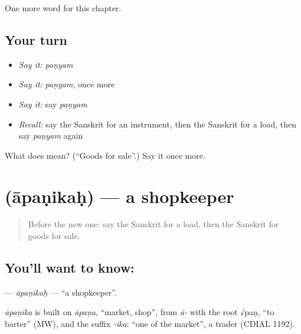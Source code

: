 \begin{grammarlens}[title={What you've built}]
One more word for this chapter.
\end{grammarlens}

\subsection*{Your turn}
\begin{itemize}
\raggedright
  \item \emph{Say it:} \emph{paṇyam}
  \item \emph{Say it:} \emph{paṇyam}, once more
  \item \emph{Say it:} say \emph{paṇyam}
  \item \emph{Recall:} say the Sanskrit for an instrument, then the Sanskrit for a load, then say \emph{paṇyam} again
\end{itemize}

\begin{tcolorbox}[breakable,colback=teal!4,colframe=teal!35!black,title={Before you move on}]
What does  mean? (\textquotedblleft{}Goods for sale\textquotedblright{}.) Say it once more.
\end{tcolorbox}
\section[\texorpdfstring{\sk{आपणिकः} (āpaṇikaḥ)}{आपणिकः (āpaṇikaḥ)}]{ (āpaṇikaḥ) — a shopkeeper}

\label{lesson:SA-C222-apanikah}



\begin{quote}
Before the new one: say the Sanskrit for a load, then the Sanskrit for goods for sale.
\end{quote}

\subsection*{You'll want to know: }
\textbf{} — \emph{āpaṇikaḥ} — \textquotedblleft{}a shopkeeper\textquotedblright{}.

\begin{cousinweb}
\emph{āpaṇika} is built on \emph{āpaṇa}, \textquotedblleft{}market, shop\textquotedblright{}, from \emph{ā-} with the root √paṇ, \textquotedblleft{}to barter\textquotedblright{} (MW), and the suffix \emph{-ika}: \textquotedblleft{}one of the market\textquotedblright{}, a trader (CDIAL 1192).
\end{cousinweb}

